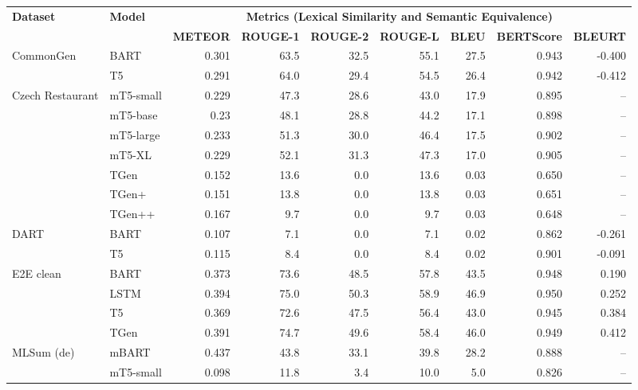 \documentclass[11pt,a4paper]{article}
\begin{document}
\renewcommand{\arraystretch}{0.75}\begin{table*}[!htbp]
\centering
\small
\begin{tabular}{@{}llrrrrrrr@{}}
\toprule
\multirow{2}{*}{\textbf{Dataset}} & \multirow{2}{*}{\textbf{Model}} & \multicolumn{7}{c}{\textbf{Metrics {\fontsize{9}{10}\selectfont (Lexical Similarity and Semantic Equivalence)}}} \\ 
 &  & {\fontsize{7.5}{9}\selectfont \textbf{METEOR}} & {\fontsize{7.5}{9}\selectfont \textbf{ROUGE-1}} & {\fontsize{7.5}{9}\selectfont \textbf{ROUGE-2}} & {\fontsize{7.5}{9}\selectfont \textbf{ROUGE-L}} & {\fontsize{7.5}{9}\selectfont \textbf{BLEU}} & {\fontsize{7.5}{9}\selectfont \textbf{BERTScore}} & {\fontsize{7.5}{9}\selectfont \textbf{BLEURT}} \\ \toprule
\multirow{2}{*}{CommonGen} & \small{BART} & 0.301 & 63.5 & 32.5 & 55.1 & 27.5 & 0.943 & -0.400 \\
 & \small{T5} & 0.291 & 64.0 & 29.4 & 54.5 & 26.4 & 0.942 & -0.412 \\
\midrule
\multirow{3}{*}{Czech Restaurant} & \small{mT5-small} & 0.229 & 47.3 & 28.6 & 43.0 & 17.9 & 0.895 & -- \\
& \small{mT5-base} & 0.23 & 48.1 & 28.8 & 44.2 & 17.1 & 0.898 & -- \\
& \small{mT5-large} & 0.233 & 51.3 & 30.0 & 46.4 & 17.5 & 0.902 & -- \\
& \small{mT5-XL} & 0.229 & 52.1 & 31.3 & 47.3 & 17.0 & 0.905 & -- \\
 & \small{TGen} & 0.152 & 13.6 & 0.0 & 13.6 & 0.03 & 0.650 & -- \\
 & \small{TGen+}  & 0.151 & 13.8 & 0.0 & 13.8 & 0.03 & 0.651 & --  \\
 & \small{TGen++} & 0.167 & 9.7 & 0.0 & 9.7 & 0.03 & 0.648 & -- \\
\midrule
\multirow{2}{*}{DART} & \small{BART} & 0.107 & 7.1 & 0.0 & 7.1 & 0.02 & 0.862 & -0.261 \\
 & \small{T5} & 0.115 & 8.4 & 0.0 & 8.4 & 0.02 & 0.901 & -0.091 \\
\midrule
\multirow{4}{*}{E2E clean} & \small{BART} & 0.373 & 73.6 & 48.5 & 57.8 & 43.5 & 0.948 & 0.190 \\
 & \small{LSTM} & 0.394 & 75.0 & 50.3 & 58.9 & 46.9 & 0.950 & 0.252 \\
 & \small{T5} & 0.369 & 72.6 & 47.5 & 56.4 & 43.0 & 0.945 & 0.384 \\
 & \small{TGen} & 0.391 & 74.7 & 49.6 & 58.4 & 46.0 & 0.949 & 0.412 \\
\midrule
\small{MLSum (de)} & \small{mBART} & 0.437 & 43.8 & 33.1 & 39.8 & 28.2 & 0.888 & -- \\
& \small{mT5-small} & 0.098 & 11.8 & 3.4 & 10.0 & 5.0 & 0.826 & -- \\


\end{tabular}
\end{table*}
\end{document}

